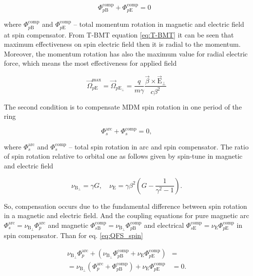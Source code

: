 \documentclass[submitting]{nst}
\begin{document}
\begin{equation}
	\Phi_{p\textrm{B}}^{\textrm{comp}}+{\Phi}_{p\textrm{E}}^{\textrm{comp}} = 0\ \ \ 
\end{equation}

\noindent where $\Phi_{p\textrm{B}}^{\textrm{comp}}$ and ${\Phi}_{p\textrm{E}}^{\textrm{comp}}$ -- total momentum rotation in magnetic and electric field at spin compensator. From T-BMT equation \ref{eq:T-BMT} it can be seen that maximum effectiveness on spin electric field then it is radial to the momentum. Moreover, the momentum rotation has also the maximum value for radial electric force, which means the most effectiveness for applied field

\begin{equation}
	\vec{\Omega}_{p\mathrm{E}}^{\text{max}} = \vec{\Omega}_{p\mathrm{E}_{\perp}}=\frac{q}{m \gamma} \frac{\vec{\beta} \times \vec{\mathrm{E}}_{\perp}}{c \beta^2}
\end{equation}

\par The second condition is to compensate MDM spin rotation in one period of the ring 

\begin{equation}
	\Phi_s^{\textrm{arc}}+\Phi_{s}^{\textrm{comp}}=0,
	\label{eq:QFS_spin}
\end{equation}

\noindent where $\Phi_s^{\textrm{arc}}$ and $\Phi_{s}^{\textrm{comp}}$ -- total spin rotation in arc and spin compensator. The ratio of spin rotation relative to orbital one as follows given by spin-tune in magnetic and electric field

\begin{equation}
	\nu_{\mathrm{B}_{\perp}} = \gamma G, \quad \nu_{\mathrm{E}} = \gamma \beta^2 \left(G-\frac{1}{\gamma^{2}-1}\right).
	\label{eq:spin-tine}
\end{equation} 

 \noindent So, compensation occurs due to the fundamental difference between spin rotation in a magnetic and electric field. And the coupling equations for pure magnetic arc $\Phi_{s}^{\text{arc}} = \nu_{\mathrm{B}_{\perp}}\Phi_{p}^{\text{arc}}$ and magnetic $\Phi_{s\mathrm{B}}^{\text{comp}} = \nu_{\mathrm{B}_{\perp}}\Phi_{p\mathrm{B}}^{\text{comp}}$ and electrical $\Phi_{s\mathrm{E}}^{\text{comp}} = \nu_{\mathrm{E}}\Phi_{p\mathrm{E}}^{\text{comp}}$ in spin compensator. Than for eq. \ref{eq:QFS_spin}
 
 \begin{equation}
 	\begin{aligned}
 	\nu_{\mathrm{B}_{\perp}}\Phi_{p}^{\text{arc}} +
 	\left(\nu_{\mathrm{B}_{\perp}}\Phi_{p\mathrm{B}}^{\text{comp}} +
 	\nu_{\mathrm{E}}\Phi_{p\mathrm{E}}^{\text{comp}} \right) & = \\
 	= \nu_{\mathrm{B}_{\perp}} \left( 
 	\Phi_{p}^{\text{arc}} +
 	\Phi_{p\mathrm{B}}^{\text{comp}} \right) +
 	\nu_{\mathrm{E}}\Phi_{p\mathrm{E}}^{\text{comp}}  & = 0.
 	\label{eq:deflection}
 	\end{aligned}
 \end{equation}
  
\end{document}

